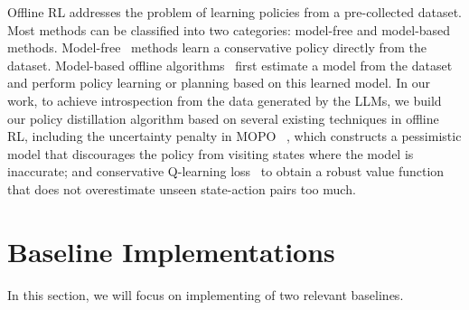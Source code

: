 Offline RL addresses the problem of learning policies from a pre-collected dataset. Most methods can be classified into two categories:
 model-free and model-based methods. Model-free~\citep{brac@2019yifan, td3-bc@2021fujimoto, bear@aviral2019, rem@2020rishabh, cql@2020aviral, iql@2021kostrikov, dsconstraint@2023ran} methods learn a conservative policy directly from the dataset. Model-based offline algorithms~\citep{mopo@2020tianhe, morel@2022rahul, maple@2023xionghui, mobile@sun2023, genoffline@luo2024} first estimate a model from the dataset and perform policy learning or planning based on this learned model. 
 In our work, to achieve introspection from the data generated by the LLMs, we build our policy distillation algorithm based on several existing techniques in offline RL, including the uncertainty penalty in MOPO~\citep{mopo@2020tianhe} , which constructs a pessimistic model that discourages the policy from visiting states where the model is inaccurate; and conservative Q-learning loss~\citep{cql@2020aviral} to obtain a robust value function that does not overestimate unseen state-action pairs too much.
 
\section{Baseline Implementations}
In this section, we will focus on implementing of two relevant baselines.
\label{app:baseline}
